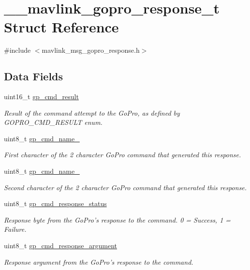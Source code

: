 \hypertarget{struct____mavlink__gopro__response__t}{\section{\+\_\+\+\_\+mavlink\+\_\+gopro\+\_\+response\+\_\+t Struct Reference}
\label{struct____mavlink__gopro__response__t}
}


{\ttfamily \#include $<$mavlink\+\_\+msg\+\_\+gopro\+\_\+response.\+h$>$}

\subsection*{Data Fields}
\begin{DoxyCompactItemize}
\item 
uint16\+\_\+t \hyperlink{struct____mavlink__gopro__response__t_aae5922dbdcb3b1f85036aa9392e69dba}{gp\+\_\+cmd\+\_\+result}
\begin{DoxyCompactList}\small\item\em Result of the command attempt to the Go\+Pro, as defined by G\+O\+P\+R\+O\+\_\+\+C\+M\+D\+\_\+\+R\+E\+S\+U\+L\+T enum. \end{DoxyCompactList}\item 
uint8\+\_\+t \hyperlink{struct____mavlink__gopro__response__t_a8eee7760ec224e994b9477be6ff7a6ea}{gp\+\_\+cmd\+\_\+name\+\_}
\begin{DoxyCompactList}\small\item\em First character of the 2 character Go\+Pro command that generated this response. \end{DoxyCompactList}\item 
uint8\+\_\+t \hyperlink{struct____mavlink__gopro__response__t_a60fbdf0f68123962d08816514f08dfe3}{gp\+\_\+cmd\+\_\+name\+\_}
\begin{DoxyCompactList}\small\item\em Second character of the 2 character Go\+Pro command that generated this response. \end{DoxyCompactList}\item 
uint8\+\_\+t \hyperlink{struct____mavlink__gopro__response__t_aeea54927916f362ea820e82cad22c2bc}{gp\+\_\+cmd\+\_\+response\+\_\+status}
\begin{DoxyCompactList}\small\item\em Response byte from the Go\+Pro's response to the command. 0 = Success, 1 = Failure. \end{DoxyCompactList}\item 
uint8\+\_\+t \hyperlink{struct____mavlink__gopro__response__t_a4a16ec02c717a3e3b0039bb36aefafe4}{gp\+\_\+cmd\+\_\+response\+\_\+argument}
\begin{DoxyCompactList}\small\item\em Response argument from the Go\+Pro's response to the command. \end{DoxyCompactList}\end{DoxyCompactItemize}



